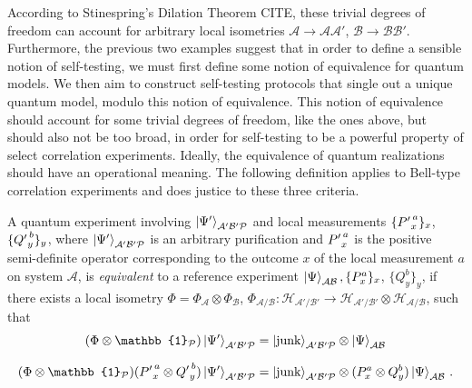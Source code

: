 According to Stinespring's Dilation Theorem CITE, these trivial degrees of freedom can account for arbitrary local isometries $\mathcal{A}\rightarrow\mathcal{AA'}$, $\mathcal{B}\rightarrow\mathcal{BB'}$. Furthermore, the previous two examples suggest that in order to define a sensible notion of self-testing, we must first define some notion of equivalence for quantum models. We then aim to construct self-testing protocols that single out a unique quantum model, modulo this notion of equivalence. This notion of equivalence should account for some trivial degrees of freedom, like the ones above, but should also not be too broad, in order for self-testing to be a powerful property of select correlation experiments. Ideally, the equivalence of quantum realizations should have an operational meaning. The following definition applies to Bell-type correlation experiments and does justice to these three criteria.

\begin{definition}[CITE]
\label{def:equivexp}
A quantum experiment involving $\ket{\Psi'}_{\mathcal{A'B'P}}$ and local measurements $\{{P'}^{\thinspace a}_x\}_x$, $\{{Q'}^{\thinspace b}_y\}_y$, where $\ket{\Psi'}_{\mathcal{A'B'P}}$ is an arbitrary purification and ${P'}^{\thinspace a}_x$ is the positive semi-definite operator corresponding to the outcome $x$ of the local measurement $a$ on system $\mathcal{A}$, is \emph{equivalent} to a reference experiment $\ket{\Psi}_{\mathcal{AB}}, \{P_x^a\}_x$, $\{Q_y^b\}_y$, if there exists a local isometry $\Phi=\Phi_{\mathcal{A}}\otimes\Phi_{\mathcal{B}}$, $\Phi_{\mathcal{A/B}}\colon\mathcal{H}_{\mathcal{A'/B'}}\rightarrow\mathcal{H}_{\mathcal{A'/B'}}\otimes\mathcal{H}_{\mathcal{A/B}}$, such that
\begin{align*}
    (\Phi\otimes\mathbb{1}_{\mathcal{P}})\ket{\Psi'}_{\mathcal{A'B'P}} & =\ket{\text{junk}}_\mathcal{{A'B'P}}\otimes\ket{\Psi}_{\mathcal{AB}} \\[0.7em]
    (\Phi\otimes\mathbb{1}_{\mathcal{P}})({P'}^{\thinspace a}_x\otimes {Q'}^{\thinspace b}_y)\ket{\Psi'}_{\mathcal{A'B'P}} & =\ket{\text{junk}}_{\mathcal{A'B'P}}\otimes(P^a_x\otimes Q^b_y)\ket{\Psi}_{\mathcal{AB}} \thinspace .
\end{align*}
\end{definition}

